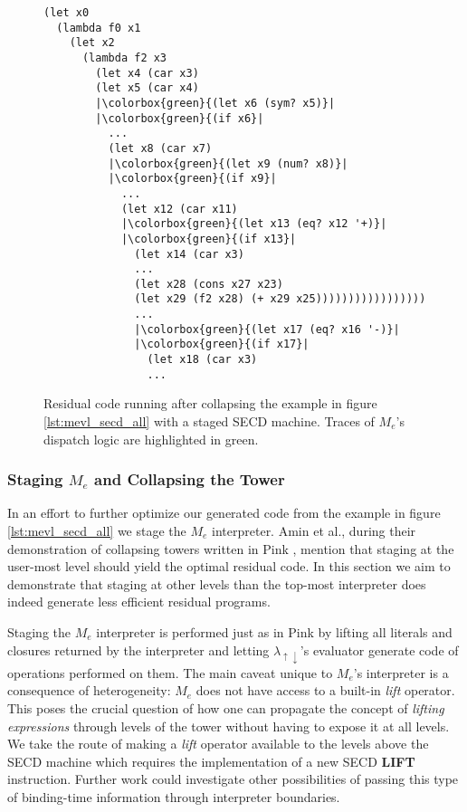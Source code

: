 \documentclass[a4paper,12pt,twoside,openright]{report}
\theoremstyle{definition}
\newcommand{\mslang}{$\lambda_{\uparrow\downarrow}$}
\newcommand{\mevl}{$M_{e}$}
\begin{document}
\begin{figure}[htp!]
\centering
    \begin{verbatim}
(let x0
  (lambda f0 x1
    (let x2
      (lambda f2 x3
        (let x4 (car x3)
        (let x5 (car x4)
        |\colorbox{green}{(let x6 (sym? x5)}|
        |\colorbox{green}{(if x6}|
          ...
          (let x8 (car x7)
          |\colorbox{green}{(let x9 (num? x8)}|
          |\colorbox{green}{(if x9}|
            ...
            (let x12 (car x11)
            |\colorbox{green}{(let x13 (eq? x12 '+)}|
            |\colorbox{green}{(if x13}|
              (let x14 (car x3)
              ...
              (let x28 (cons x27 x23)
              (let x29 (f2 x28) (+ x29 x25)))))))))))))))))
              ...
              |\colorbox{green}{(let x17 (eq? x16 '-)}|
              |\colorbox{green}{(if x17}|
                (let x18 (car x3)
                ...
    \end{verbatim}
\caption{Residual code running after collapsing the example in figure \ref{lst:mevl_secd_all} with a staged SECD machine. Traces of \mevl's dispatch logic are highlighted in green.}
\label{lst:mevl_secd_ped}
\end{figure}
\newpage

\subsubsection{Staging \texorpdfstring{\mevl}{Lg} and Collapsing the Tower}\label{ssubsec:mevl_staged}
In an effort to further optimize our generated code from the example in figure \ref{lst:mevl_secd_all} we stage the \mevl{} interpreter. Amin et al., during their demonstration of collapsing towers written in Pink \cite{amin2017collapsing}, mention that staging at the user-most level should yield the optimal residual code. In this section we aim to demonstrate that staging at other levels than the top-most interpreter does indeed generate less efficient residual programs.

Staging the \mevl{} interpreter is performed just as in Pink by lifting all literals and closures returned by the interpreter and letting \mslang's evaluator generate code of operations performed on them. The main caveat unique to \mevl's interpreter is a consequence of heterogeneity: \mevl{} does not have access to a built-in \textit{lift} operator. This poses the crucial question of how one can propagate the concept of \textit{lifting expressions} through levels of the tower without having to expose it at all levels. We take the route of making a \textit{lift} operator available to the levels above the SECD machine which requires the implementation of a new SECD \textbf{LIFT} instruction. Further work could investigate other possibilities of passing this type of binding-time information through interpreter boundaries.
\end{document}
